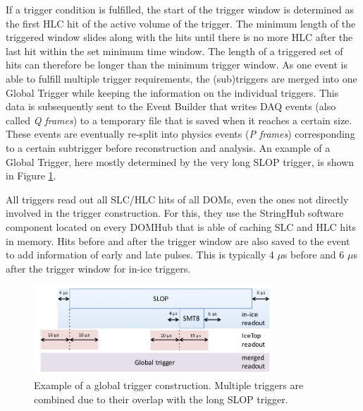 \noindent If a trigger condition is fulfilled, the start of the trigger window is determined as the first HLC hit of the active volume of the trigger. The minimum length of the triggered window slides along with the hits until there is no more HLC after the last hit within the set minimum time window. The length of a triggered set of hits can therefore be longer than the minimum trigger window. As one event is able to fulfill multiple trigger requirements, the (sub)triggers are merged into one Global Trigger while keeping the information on the individual triggers. This data is subsequently sent to the Event Builder that writes DAQ events (also called \textit{Q frames}) to a temporary file that is saved when it reaches a certain size. These events are eventually re-split into physics events (\textit{P frames}) corresponding to a certain subtrigger before reconstruction and analysis. An example of a Global Trigger, here mostly determined by the very long SLOP trigger, is shown in Figure \ref{fig:globaltrigger}.

All triggers read out all SLC/HLC hits of all DOMs, even the ones not directly involved in the trigger construction. For this, they use the StringHub software component located on every DOMHub that is able of caching SLC and HLC hits in memory. Hits before and after the trigger window are also saved to the event to add information of early and late pulses. This is typically 4 $\mu$s before and 6 $\mu$s after the trigger window for in-ice triggers. 




\begin{figure}[t]
\centering
\includegraphics[width=0.8\textwidth]{chapter5/img/globaltrigger.png}
\caption{Example of a global trigger construction. Multiple triggers are combined due to their overlap with the long SLOP trigger.}
\label{fig:globaltrigger}
\end{figure}


